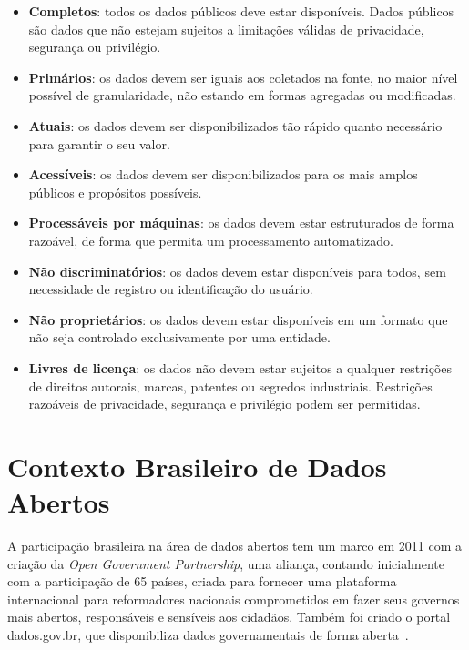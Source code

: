 \begin{itemize}
\item \textbf{Completos}: todos os dados públicos deve estar disponíveis. Dados públicos são dados que não estejam sujeitos a limitações válidas de privacidade, segurança ou privilégio.

\item \textbf{Primários}: os dados devem ser iguais aos coletados na fonte, no maior nível possível de granularidade, não estando em formas agregadas ou modificadas.

\item \textbf{Atuais}: os dados devem ser disponibilizados tão rápido quanto necessário para garantir o seu valor.

\item \textbf{Acessíveis}: os dados devem ser disponibilizados para os mais amplos públicos e propósitos possíveis.

\item \textbf{Processáveis por máquinas}: os dados devem estar estruturados de forma razoável, de forma que permita um processamento automatizado.

\item \textbf{Não discriminatórios}: os dados devem estar disponíveis para todos, sem necessidade de registro ou identificação do usuário.

\item \textbf{Não proprietários}: os dados devem estar disponíveis em um formato que não seja controlado exclusivamente por uma entidade.

\item \textbf{Livres de licença}: os dados não devem estar sujeitos a qualquer restrições de direitos autorais, marcas, patentes ou segredos industriais. Restrições razoáveis de privacidade, segurança e privilégio podem ser permitidas.

\end{itemize}

\section{Contexto Brasileiro de Dados Abertos}
A participação brasileira na área de dados abertos tem um marco em 2011 com a criação da \emph{Open Government Partnership}, uma aliança, contando inicialmente com a participação de 65 países, criada para fornecer uma plataforma internacional para reformadores nacionais comprometidos em fazer seus governos mais abertos, responsáveis e sensíveis aos cidadãos. Também foi criado o portal dados.gov.br, que disponibiliza dados governamentais de forma aberta~\cite{seijiconectados}.

